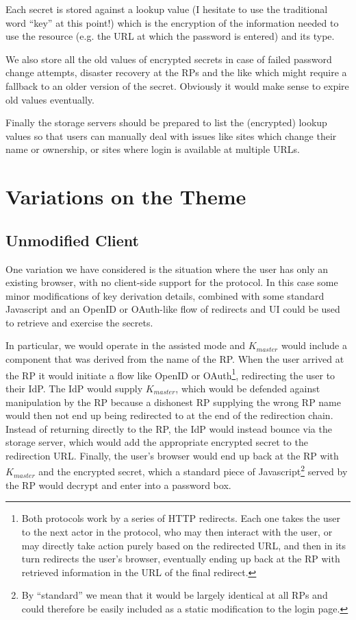 \documentclass[a4paper,titlepage]{article}
\begin{document}
Each secret is stored against a lookup value (I hesitate to use the
traditional word ``key'' at this point!) which is the encryption of
the information needed to use the resource (e.g. the URL at which the
password is entered) and its type.

We also store all the old values of encrypted secrets in case of
failed password change attempts, disaster recovery at the RPs and the
like which might require a fallback to an older version of the
secret. Obviously it would make sense to expire old values eventually.

Finally the storage servers should be prepared to list the (encrypted)
lookup values so that users can manually deal with issues like sites
which change their name or ownership, or sites where login is
available at multiple URLs.

\section{Variations on the Theme}

\subsection{Unmodified Client}

One variation we have considered is the situation where the user has
only an existing browser, with no client-side support for the
protocol. In this case some minor modifications of key derivation
details, combined with some standard Javascript and an OpenID or
OAuth-like flow of redirects and UI could be used to retrieve and
exercise the secrets.

In particular, we would operate in the assisted mode and $K_{master}$
would include a component that was derived from the name of the
RP. When the user arrived at the RP it would initiate a flow like
OpenID or OAuth\footnote{Both protocols work by a series of HTTP
  redirects. Each one takes the user to the next actor in the
  protocol, who may then interact with the user, or may directly take
  action purely based on the redirected URL, and then in its turn
  redirects the user's browser, eventually ending up back at the RP
  with retrieved information in the URL of the final redirect.},
redirecting the user to their IdP. The IdP would supply $K_{master}$,
which would be defended against manipulation by the RP because a
dishonest RP supplying the wrong RP name would then not end up being
redirected to at the end of the redirection chain. Instead of
returning directly to the RP, the IdP would instead bounce via the
storage server, which would add the appropriate encrypted secret to
the redirection URL. Finally, the user's browser would end up back at
the RP with $K_{master}$ and the encrypted secret, which a standard
piece of Javascript\footnote{By ``standard'' we mean that it would be
  largely identical at all RPs and could therefore be easily included
  as a static modification to the login page.} served by the RP would
decrypt and enter into a password box.
\end{document}
